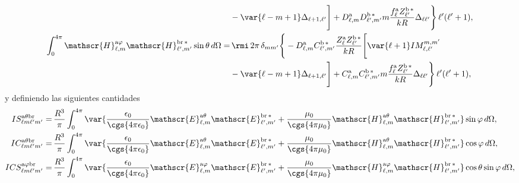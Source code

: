 \begin{align}
% 
&-\var{\ell - m +1} \Delta_{\ell + 1, \ell^{\prime}}  \Bigg]
%
+ D_{\ell, m}^{\rm a} D_{\ell^{\prime}, m^{\prime}}^{\rm b \, *} m \frac{f_{\ell}^{\rm a} Z_{\ell^{\prime}}^{\rm b\, *}}{k R} \Delta_{\ell \ell^{\prime}} \Bigg\} \, \ell^{\prime}(\ell^{\prime}+1),\\
%
%
\int_0^{4\pi}\mathscr{H}_{\ell, m}^{\text{a}\varphi}\mathscr{H}_{\ell^{\prime}, m^{\prime}}^{\text{br}\,*}\sin\theta \, d\Omega
%
 =& \, \rmi \, 2\pi \, \delta_{m m^{\prime}} \Bigg\{ -D_{\ell, m}^{\rm a} C_{\ell^{\prime}, m^{\prime}}^{\rm b \, *} \frac{Z_{\ell}^{\rm a} Z_{\ell^{\prime}}^{\rm b \, *}}{k R} \Bigg[\var{\ell +1} IM_{\ell, \ell^{\prime}}^{m, m^{\prime}} \nonumber \\ 
% 
&-\var{\ell - m +1} \Delta_{\ell + 1, \ell^{\prime}}  \Bigg]
%
+ C_{\ell, m}^{\rm a} C_{\ell^{\prime}, m^{\prime}}^{\rm b \, *} m \frac{f_{\ell}^{\rm a} Z_{\ell^{\prime}}^{\rm b\, *}}{k R} \Delta_{\ell \ell^{\prime}} \Bigg\} \, \ell^{\prime}(\ell^{\prime}+1),
\end{align}
y definiendo las siguientes cantidades
\begin{align}
IS_{\ell m \ell^{\prime} m^{\prime}}^{\rm a \theta b r} 
=& \, \frac{R^3}{\pi} \int_{0}^{4\pi} \var{\frac{\epsilon_0}{\cgs{4\pi\epsilon_0}}\mathscr{E}_{\ell, m}^{\text{a}\theta}\mathscr{E}_{\ell^{\prime}, m^{\prime}}^{\text{br}\,*} + \frac{\mu_0}{\cgs{4\pi\mu_0}}\mathscr{H}_{\ell, m}^{\text{a}\theta}\mathscr{H}_{\ell^{\prime}, m^{\prime}}^{\text{br}\,*} } \sin\varphi \, d\Omega ,
\\
%
%
%
IC_{\ell m \ell^{\prime} m^{\prime}}^{\rm a \theta b r} 
=& \, \frac{R^3}{\pi} \int_{0}^{4\pi} \var{\frac{\epsilon_0}{\cgs{4\pi\epsilon_0}}\mathscr{E}_{\ell, m}^{\text{a}\theta}\mathscr{E}_{\ell^{\prime}, m^{\prime}}^{\text{br}\,*} + \frac{\mu_0}{\cgs{4\pi\mu_0}}\mathscr{H}_{\ell, m}^{\text{a}\theta}\mathscr{H}_{\ell^{\prime}, m^{\prime}}^{\text{br}\,*} } \cos\varphi \, d\Omega,\\
%
%
% 
ICS_{\ell m \ell^{\prime} m^{\prime}}^{\rm a \varphi b r}
=& \, \frac{R^3}{\pi} \int_0^{4\pi} \var{ \frac{\epsilon_0}{\cgs{4\pi\epsilon_0}} \mathscr{E}_{\ell, m}^{\text{a}\varphi}\mathscr{E}_{\ell^{\prime}, m^{\prime}}^{\text{br}\,*} + \frac{\mu_0}{\cgs{4\pi\mu_0}} \mathscr{H}_{\ell, m}^{\text{a}\varphi}\mathscr{H}_{\ell^{\prime}, m^{\prime}}^{\text{br}\,*}}\cos\theta\sin\varphi \, d\Omega,  
%
\end{align}
\vspace{-0.8cm}
